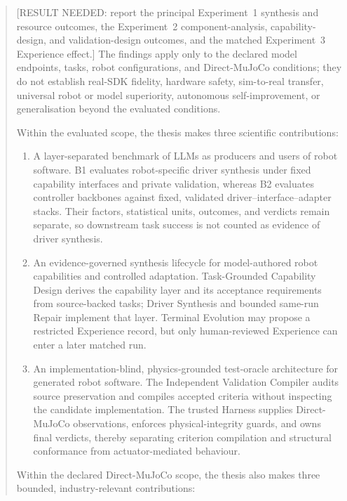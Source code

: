\begin{abstract}
[RESULT NEEDED: report the principal Experiment~1 synthesis and resource
outcomes, the Experiment~2 component-analysis, capability-design, and
validation-design outcomes, and the matched Experiment~3 Experience effect.]
The findings apply only to the
declared model endpoints, tasks, robot configurations, and Direct-MuJoCo
conditions; they do not establish real-SDK fidelity, hardware safety,
sim-to-real transfer, universal robot or model superiority, autonomous
self-improvement, or generalisation beyond the evaluated conditions.

Within the evaluated scope, the thesis makes three scientific contributions:
\vspace{-.65\baselineskip}
\begin{enumerate}[leftmargin=*,labelsep=.8em,nosep]

  \item A layer-separated benchmark of LLMs as producers and users of robot
  software. B1 evaluates robot-specific driver synthesis under fixed
  capability interfaces and private validation, whereas B2 evaluates
  controller backbones against fixed, validated
  driver--interface--adapter stacks. Their factors, statistical units,
  outcomes, and verdicts remain separate, so downstream task success is not
  counted as evidence of driver synthesis.

  \item An evidence-governed synthesis lifecycle for model-authored robot
  capabilities and controlled adaptation. Task-Grounded Capability Design
  derives the capability layer and its acceptance requirements from
  source-backed tasks; Driver Synthesis and bounded same-run Repair implement
  that layer. Terminal Evolution may propose a restricted Experience record,
  but only human-reviewed Experience can enter a later matched run.

  \item An implementation-blind, physics-grounded test-oracle architecture for
  generated robot software. The Independent Validation Compiler audits source
  preservation and compiles accepted criteria without inspecting the candidate
  implementation. The trusted Harness supplies Direct-MuJoCo observations,
  enforces physical-integrity guards, and owns final verdicts, thereby
  separating criterion compilation and structural conformance from
  actuator-mediated behaviour.

\end{enumerate}

Within the declared Direct-MuJoCo scope, the thesis also makes three bounded,
industry-relevant contributions:
\vspace{-.65\baselineskip}
\begin{enumerate}[leftmargin=*,labelsep=.8em,nosep]


\end{enumerate}
\end{abstract}
